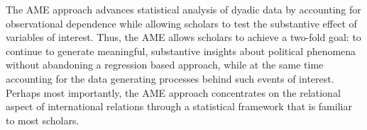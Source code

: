 The AME approach advances statistical analysis of dyadic data by accounting for observational dependence while allowing scholars to test the substantive effect of variables of interest. Thus, the AME allows scholars to achieve a two-fold goal: to continue to generate meaningful, substantive insights about political phenomena without abandoning a regression based approach, while at the same time accounting for the data generating processes behind such events of interest. Perhaps most importantly, the AME approach concentrates on the relational aspect of international relations through a statistical framework that is familiar to most scholars.

